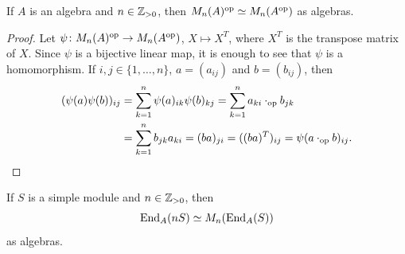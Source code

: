 \begin{lemma}
	\label{lem:Mn_op}
	If $A$ is an algebra and $n\in\mathbb{Z}_{>0}$, then $M_n(A)^{\operatorname{op}}\simeq
	M_n(A^{\operatorname{op}})$ as algebras.   
\end{lemma}

\begin{proof}
	Let $\psi\colon M_n(A)^{\operatorname{op}}\to M_n(A^{\operatorname{op}})$, $X\mapsto X^T$,
	where $X^T$ is the transpose matrix of $X$. Since $\psi$ is a bijective linear map, it is enough
	to see that $\psi$ is a homomorphism. If $i,j\in\{1,\dots,n\}$, $a=(a_{ij})$ and $b=(b_{ij})$, then 
	\begin{align*}
		(\psi(a)\psi(b))_{ij}&=\sum_{k=1}^n \psi(a)_{ik}\psi(b)_{kj}=\sum_{k=1}^n a_{ki}\cdot_{\operatorname{op}}b_{jk}\\
		&=\sum_{k=1}^n b_{jk}a_{ki}=(ba)_{ji}=((ba)^T)_{ij}=\psi(a\cdot_{\operatorname{op}}b)_{ij}.\qedhere
	\end{align*}
\end{proof}

\begin{lemma}
	\label{lem:simple}
	If $S$ is a simple module and $n\in\mathbb{Z}_{>0}$, then  
	\[
		\operatorname{End}_A(nS)\simeq M_n(\operatorname{End}_A(S))
	\]
	as algebras.
\end{lemma}

